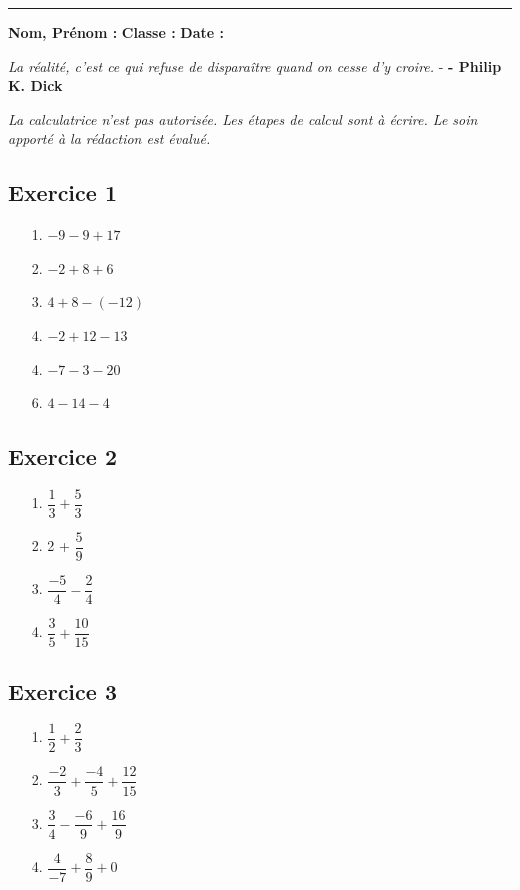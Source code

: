 \documentclass[12pt]{article}
\newcommand{\horrule}[1]{\rule{\linewidth}{#1}}
\begin{document}
\vspace{0.4cm}
\horrule{1px}
\vspace{0.4cm}

\textbf{Nom, Prénom :} \hspace{8cm} \textbf{Classe :} \hspace{3cm} \textbf{Date :}
\begin{center}
  \textit{La réalité, c'est ce qui refuse de disparaître quand on cesse d'y croire.}  - \textbf{ - Philip K. Dick}
\end{center}
\textit{La calculatrice n'est pas autorisée. Les étapes de calcul sont à écrire. Le soin apporté à la rédaction est évalué.}

\begin{multicols}{3}

\subsection*{Exercice 1} 

\begin{enumerate}
\item[1.] $-9 - 9 + 17 $
\item[2.] $-2 + 8 + 6  $
\item[3.] $4 + 8 -(-12)$
\item[4.] $-2 + 12 - 13$
\item[4.] $-7 - 3 - 20 $
\item[6.] $4 - 14 - 4  $
\end{enumerate}

\subsection*{Exercice 2}


\begin{enumerate}
\item[1.] $\dfrac{1}{3} + \dfrac{5}{3}$
\item[2.] 2 + $\dfrac{5}{9}$
\item[3.] $\dfrac{-5}{4} - \dfrac{2}{4}$
\item[4.] $\dfrac{3}{5} + \dfrac{10}{15}$
\end{enumerate}



\subsection*{Exercice 3}

\begin{enumerate}
\item[1.] $\dfrac{1}{2} + \dfrac{2}{3}$
\item[2.] $\dfrac{-2}{3} + \dfrac{-4}{5} + \dfrac{12}{15}$
\item[3.] $\dfrac{3}{4} - \dfrac{-6}{9} + \dfrac{16}{9}$
\item[4.] $\dfrac{4}{-7} + \dfrac{8}{9} + 0$
\end{enumerate}

\end{multicols}
\end{document}
